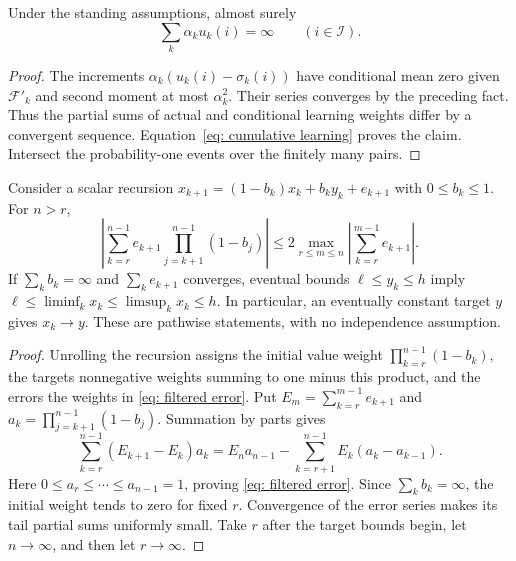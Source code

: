 \begin{lemma}\label{lem: actual learning}
Under the standing assumptions, almost surely
\[
\sum_k\alpha_k u_k(i)=\infty\qquad(i\in\mathcal I).
\]
\end{lemma}
\begin{proof}
The increments $\alpha_k(u_k(i)-\sigma_k(i))$ have conditional mean zero given $\mathcal F'_k$ and second moment at most $\alpha_k^2$. Their series converges by the preceding fact. Thus the partial sums of actual and conditional learning weights differ by a convergent sequence. Equation~\eqref{eq: cumulative learning} proves the claim. Intersect the probability-one events over the finitely many pairs.
\end{proof}

\begin{lemma}\label{lem: filtering}
Consider a scalar recursion $x_{k+1}=(1-b_k)x_k+b_ky_k+e_{k+1}$ with $0\le b_k\le1$. For $n>r$,
\begin{equation}\label{eq: filtered error}
\left|\sum_{k=r}^{n-1}e_{k+1}\prod_{j=k+1}^{n-1}(1-b_j)\right|
\le2\max_{r\le m\le n}\left|\sum_{k=r}^{m-1}e_{k+1}\right|.
\end{equation}
If $\sum_k b_k=\infty$ and $\sum_k e_{k+1}$ converges, eventual bounds $\ell\le y_k\le h$ imply $\ell\le\liminf_k x_k\le\limsup_k x_k\le h$. In particular, an eventually constant target $y$ gives $x_k\to y$. These are pathwise statements, with no independence assumption.
\end{lemma}
\begin{proof}
Unrolling the recursion assigns the initial value weight $\prod_{k=r}^{n-1}(1-b_k)$, the targets nonnegative weights summing to one minus this product, and the errors the weights in \eqref{eq: filtered error}. Put $E_m=\sum_{k=r}^{m-1}e_{k+1}$ and $a_k=\prod_{j=k+1}^{n-1}(1-b_j)$. Summation by parts gives
\[
\sum_{k=r}^{n-1}(E_{k+1}-E_k)a_k
=E_n a_{n-1}-\sum_{k=r+1}^{n-1}E_k(a_k-a_{k-1}).
\]
Here $0\le a_r\le\cdots\le a_{n-1}=1$, proving \eqref{eq: filtered error}. Since $\sum_kb_k=\infty$, the initial weight tends to zero for fixed $r$. Convergence of the error series makes its tail partial sums uniformly small. Take $r$ after the target bounds begin, let $n\to\infty$, and then let $r\to\infty$.
\end{proof}

